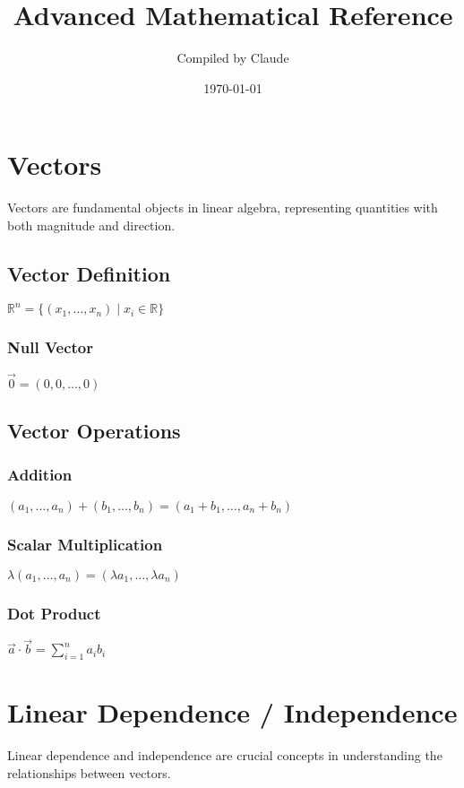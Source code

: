 \documentclass[12pt,a4paper]{article}
\begin{document}
\title{\textbf{Advanced Mathematical Reference}}
\author{Compiled by Claude}
\date{\today}

\maketitle
\tableofcontents

\section{Vectors}
\begin{info-box}
Vectors are fundamental objects in linear algebra, representing quantities with both magnitude and direction.
\end{info-box}

\subsection{Vector Definition}
$\mathbb{R}^n = \{ (x_1, \ldots, x_n) \mid x_i \in \mathbb{R} \}$

\subsubsection{Null Vector}
$\vec{0} = (0, 0, \ldots, 0)$

\subsection{Vector Operations}

\subsubsection{Addition}
$(a_1, \ldots, a_n) + (b_1, \ldots, b_n) = (a_1 + b_1, \ldots, a_n + b_n)$

\subsubsection{Scalar Multiplication}
$\lambda(a_1, \ldots, a_n) = (\lambda a_1, \ldots, \lambda a_n)$

\subsubsection{Dot Product}
$\vec{a} \cdot \vec{b} = \sum_{i=1}^n a_i b_i$

\section{Linear Dependence / Independence}
\begin{info-box}
Linear dependence and independence are crucial concepts in understanding the relationships between vectors.
\end{info-box}
\end{document}
